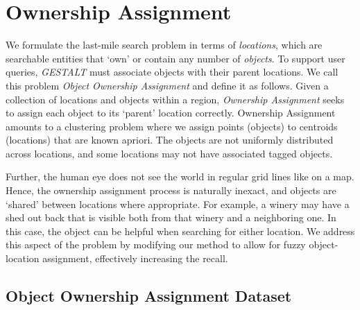 \section{Ownership Assignment}
\label{section:ownership}

We formulate the last-mile search problem in terms of \textit{locations}, which are searchable entities that `own' or contain any number of \textit{objects}. %
To support user queries, \emph{GESTALT} must associate objects with their parent locations.
We call this problem \textit{Object Ownership Assignment} and define it as follows.
Given a collection of locations and objects within a region, \emph{Ownership Assignment} seeks to assign each object to its `parent' location correctly. 
Ownership Assignment amounts to a clustering problem where we assign points (objects) to centroids (locations) that are known apriori. 
The objects are not uniformly distributed across locations, and some locations may not have associated tagged objects. 

Further, the human eye does not see the world in regular grid lines like on a map. Hence, the ownership assignment process is naturally inexact, and objects are `shared' between locations where appropriate.
For example, a winery may have a shed out back that is visible both from that winery and a neighboring one. 
In this case, the object can be helpful when searching for either location. 
We address this aspect of the problem by modifying our method to allow for fuzzy object-location assignment, effectively increasing the recall. 

\subsection{Object Ownership Assignment Dataset}

